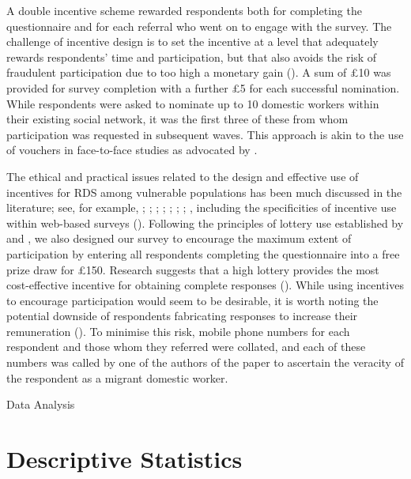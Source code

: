 \documentclass[
  12pt,
  letterpaper,
  DIV=11,
  numbers=noendperiod]{scrartcl}
\theoremstyle{plain}
\theoremstyle{definition}
\begin{document}
A double incentive scheme rewarded respondents both for completing the
questionnaire and for each referral who went on to engage with the
survey. The challenge of incentive design is to set the incentive at a
level that adequately rewards respondents' time and participation, but
that also avoids the risk of fraudulent participation due to too high a
monetary gain (\textcite{jordan_overcoming_2020}). A sum of £10 was
provided for survey completion with a further £5 for each successful
nomination. While respondents were asked to nominate up to 10 domestic
workers within their existing social network, it was the first three of
these from whom participation was requested in subsequent waves. This
approach is akin to the use of vouchers in face-to-face studies as
advocated by \textcite{thompson_new_2020}.

The ethical and practical issues related to the design and effective use
of incentives for RDS among vulnerable populations has been much
discussed in the literature; see, for example,
\textcite{wang_respondent-driven_2005};
\textcite{abdul-quader_effectiveness_2006};
\textcite{singer_incentives_2006}; \textcite{dejong_ethical_2009};
\textcite{semaan_ethical_2009}; \textcite{brunovskis_untold_2010};
\textcite{semaan_time-space_2010}; \textcite{platt_adapting_2015},
including the specificities of incentive use within web-based surveys
(\textcite{cobanoglu_effect_2003}). Following the principles of lottery
use established by \textcite{brown_you_2006} and
\textcite{laguilles_can_2011}, we also designed our survey to encourage
the maximum extent of participation by entering all respondents
completing the questionnaire into a free prize draw for £150. Research
suggests that a high lottery provides the most cost-effective incentive
for obtaining complete responses
(\textcite{gajic_cost-effectiveness_2012}). While using incentives to
encourage participation would seem to be desirable, it is worth noting
the potential downside of respondents fabricating responses to increase
their remuneration (\textcite{robinson_sampling_2014}). To minimise this
risk, mobile phone numbers for each respondent and those whom they
referred were collated, and each of these numbers was called by one of
the authors of the paper to ascertain the veracity of the respondent as
a migrant domestic worker.

Data Analysis

\section{Descriptive Statistics}\label{descriptive-statistics}
\end{document}
